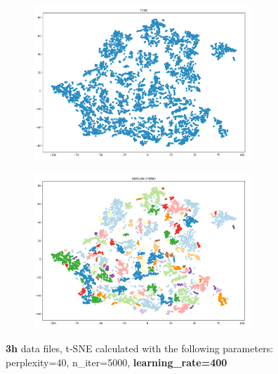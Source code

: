 \begin{figure}[H]
	\centering
	
  \centering
	\begin{subfigure}{.5\textwidth}
    \centering
    \includegraphics[width=0.9\textwidth]{./images/tsneParametersTest/learningRate/lr400-3hTSNE.png}
  \end{subfigure}%
  \begin{subfigure}{.5\textwidth}
    \centering
    \includegraphics[width=0.9\textwidth]{./images/tsneParametersTest/learningRate/lr400-3hDBSCAN.png}
	\end{subfigure}
	\caption{\textbf{3h} data files, t-SNE calculated with the following parameters: perplexity=40, n\_iter=5000, \textbf{learning\_rate=400}}
  \label{figure:3hlr400TSNE}
\end{figure}


